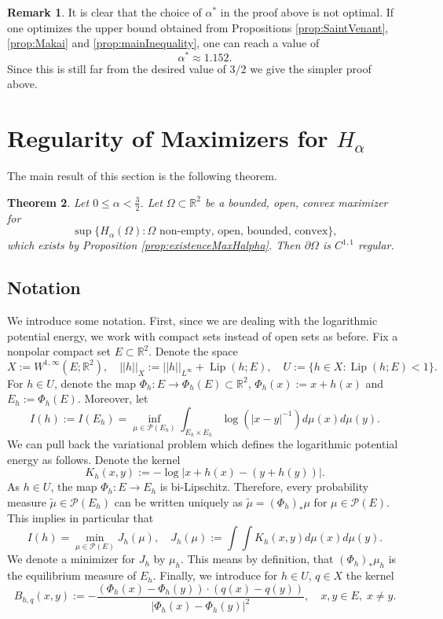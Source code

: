 \documentclass[11pt]{article}
\theoremstyle{plain}
\numberwithin{equation}{section}
\newtheorem{theorem}{Theorem}[section]
\theoremstyle{definition}
\newtheorem{remark}[theorem]{Remark}
\DeclareMathOperator{\Lip}{Lip}
\def \Om{\Omega}
\def \R {\mathbb{R}}
\def \p{\partial}
\def \mc{\mathcal}
\begin{document}
    \begin{remark}
        It is clear that the choice of $\alpha^*$ in the proof above is not optimal. If one optimizes the upper bound obtained from Propositions \ref{prop:SaintVenant}, \ref{prop:Makai} and \ref{prop:mainInequality}, one can reach a value of
        \[
        \alpha^*\approx1.152.
        \]
        Since this is still far from the desired value of $3/2$ we give the simpler proof above.
    \end{remark}
    
    \section{Regularity of Maximizers for $H_\alpha$}
    The main result of this section is the following theorem.
    \begin{theorem}
        \label{thm:HalphaReg}
        Let $0\leq\alpha<\frac32$. Let $\Om \subset \R^2$ be a bounded, open, convex maximizer for
        \[
        \sup\{H_\alpha(\Om): \Om \text{ non-empty, open, bounded, convex}\},
        \]
        which exists by Proposition \ref{prop:existenceMaxHalpha}. Then $ \p \Om$ is $C^{1,1}$ regular.
    \end{theorem}

    \subsection{Notation}
    We introduce some notation. First, since we are dealing with the logarithmic potential energy, we work with compact sets instead of open sets as before. Fix a nonpolar compact set $E \subset \R^2$. Denote the space
    \[
    X:=W^{1,\infty}(E;\R^2),\quad ||h||_X:=||h||_{L^\infty}+\Lip(h;E), \quad U:=\{h \in X:\Lip(h;E)< 1\}.
    \]
    For $h \in U$, denote the map $\Phi_h:E\to \Phi_h(E)\subset \R^2$, $\Phi_h(x):=x+h(x)$ and $E_h:=\Phi_h(E)$. Moreover, let
    \[
    I(h):=I(E_h)=\inf_{\mu \in \mc P(E_h)}\int_{E_h\times E_h}\log(|x-y|^{-1})d\mu(x)d\mu(y).
    \]
    We can pull back the variational problem which defines the logarithmic potential energy as follows. Denote the kernel
    \[
    K_h(x,y):=-\log|x+h(x)-(y+h(y))|.
    \]
    As $h \in U$, the map $\Phi_h:E\to E_h$ is bi-Lipschitz. Therefore, every probability measure $\tilde \mu \in \mc P(E_h)$ can be written uniquely as $\tilde \mu =(\Phi_h)_*\mu$ for $\mu \in \mc P(E)$. This implies in particular that
    \[
    I(h)=\min_{\mu \in \mc P(E)} J_h(\mu),\quad J_h(\mu):=\int\int K_h(x,y)d\mu(x)d\mu(y).
    \]
    We denote a minimizer for $J_h$ by $\mu_h$. This means by definition, that $(\Phi_h)_*\mu_h$ is the equilibrium measure of $E_h$. Finally, we introduce for $h\in U$, $q \in X$ the kernel
    \[
    B_{h,q}(x,y):=-\frac{(\Phi_h(x)-\Phi_h(y))\cdot (q(x)-q(y))}{|\Phi_h(x)-\Phi_h(y)|^2},\quad x,y \in E,\;x\neq y.
    \]
\end{document}
